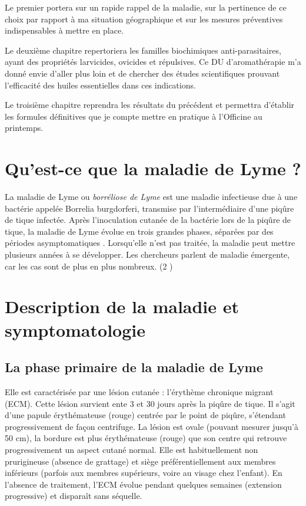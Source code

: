 \documentclass[12pt,a4wide]{article}
\begin{document}
Le premier portera sur un rapide rappel de la maladie, sur la pertinence de ce
choix par rapport à ma situation géographique et sur les mesures préventives
indispensables à mettre en place.

Le deuxième chapitre repertoriera les familles biochimiques anti-parasitaires, 
ayant des propriétés larvicides, ovicides et répulsives. Ce DU d'aromathérapie
m'a donné envie d'aller plus loin et de chercher des études scientifiques
prouvant l'efficacité des huiles essentielles dans ces indications.

Le troisième chapitre reprendra les résultats du précédent et permettra
d'établir les formules définitives que je compte mettre en pratique à l'Officine
au printemps.





\section{Qu'est-ce que la maladie de Lyme ?}
\label{sec-2}
 La maladie  de Lyme  ou \emph{borréliose  de Lyme}  est une
maladie infectieuse due  à une bactérie appelée  Borrelia burgdorferi, transmise
par l'intermédiaire d'une  piqûre de tique infectée. Après
 l'inoculation cutanée de la bactérie lors de  la piqûre de tique, la maladie de
 Lyme évolue en trois grandes  phases, séparées par des périodes asymptomatiques
.  Lorsqu'elle n'est pas traitée,  la maladie
 peut mettre plusieurs années à se développer. Les chercheurs parlent de maladie
 émergente, car les cas sont de plus en plus nombreux. (2 )

\section{Description de la maladie et symptomatologie}
\label{sec-3}
\subsection{La phase primaire de la maladie de Lyme}
\label{sec-3-1}

Elle est caractérisée par une lésion cutanée : l'érythème chronique migrant (ECM). Cette lésion survient ente 3 et 30 jours après la piqûre de tique. Il s'agit d'une papule érythémateuse (rouge) centrée par le point de piqûre, s'étendant progressivement de façon centrifuge. La lésion est ovale (pouvant mesurer jusqu'à 50 cm), la bordure est plus érythémateuse (rouge) que son centre qui retrouve progressivement un aspect cutané normal. Elle est habituellement non prurigineuse (absence de grattage) et siège préférentiellement aux membres inférieurs (parfois aux membres supérieurs, voire au visage chez l'enfant). En l'absence de traitement, l'ECM évolue pendant quelques semaines (extension progressive) et disparaît sans séquelle.
\end{document}
